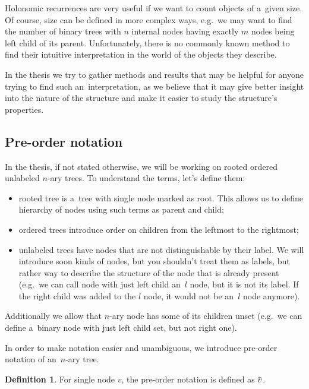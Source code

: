 \documentclass[final]{article}
\theoremstyle{definition}
\newtheorem{definition}{Definition}[subsection]
\theoremstyle{definition}
\theoremstyle{remark}
\newcommand{\ols}[1]{\mskip.5\thinmuskip\overline{\mskip-.5\thinmuskip {#1} \mskip-.5\thinmuskip}\mskip.5\thinmuskip} %
\newcommand{\enc}[1]{\ensuremath{\ols{#1}}}
\begin{document}
Holonomic recurrences are very useful if we want to count objects of a~given size. Of course, size can be defined in more complex ways, e.g.~we may want to find the number of binary trees with \(n\) internal nodes having exactly \(m\) nodes being left child of its parent. Unfortunately, there is no commonly known method to find their intuitive interpretation in the world of the objects they describe.

In the thesis we try to gather methods and results that may be helpful for anyone trying to find such an~interpretation, as we believe that it may give better insight into the nature of the structure and make it easier to study the structure's properties.

\subsection{Pre-order notation}%
\label{sub:pre_order_notation}

In the thesis, if not stated otherwise, we will be working on rooted ordered unlabeled \(n\)-ary trees. To understand the terms, let's define them:
\begin{itemize}
    \item rooted tree is a~tree with single node marked as root. This allows us to define hierarchy of nodes using such terms as parent and child;
    \item ordered trees introduce order on children from the leftmost to the rightmost;
    \item unlabeled trees have nodes that are not distinguishable by their label. We will introduce soon kinds of nodes, but you shouldn't treat them as labels, but rather way to describe the structure of the node that is already present (e.g.~we can call node with just left child an~\(l\) node, but it is not its label. If the right child was added to the \(l\) node, it would not be an~\(l\) node anymore).
\end{itemize}
Additionally we allow that \(n\)-ary node has some of its children unset (e.g.~we can define a~binary node with just left child set, but not right one).

In order to make notation easier and unambiguous, we introduce pre-order notation of an~\(n\)-ary tree.

\begin{definition}
    For single node \(v\), the pre-order notation is defined as \(\enc{v}\).
\end{definition}
\end{document}
